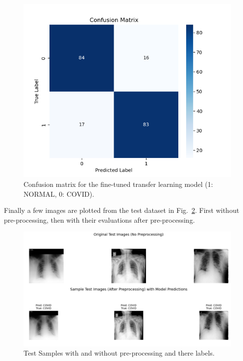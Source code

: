 \documentclass[conference]{IEEEtran}
\begin{document}
\begin{figure}[htbp]
	\centerline{\includegraphics[width=\linewidth]{Images/Transferlearning_3.png}}
	\caption{Confusion matrix for the fine-tuned transfer learning model (1: NORMAL, 0: COVID).}
	\label{fig:transferlearning_3}
\end{figure}

Finally a few images are plotted from the test dataset in Fig.~\ref{fig:transferlearning_4}. First without pre-processing, then with their evaluations after pre-processing.

\begin{figure}[htbp]
	\centerline{\includegraphics[width=\linewidth]{Images/Transferlearning_4.png}}
	\caption{Test Samples with and without pre-processing and there labels.}
	\label{fig:transferlearning_4}
\end{figure}
\end{document}
